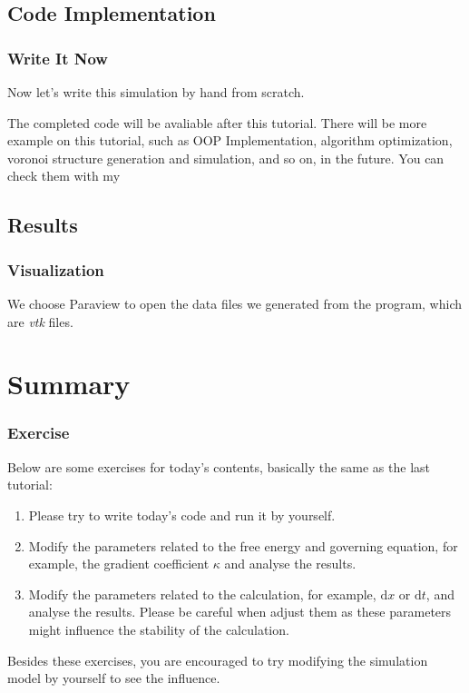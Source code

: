 \documentclass[compress,xcolor={dvipsnames}]{beamer}
\newcommand{\bhref}[2]{
    \href{#1}{\color{blue}{#2}}
}
\begin{document}
\subsection{Code Implementation}
\begin{frame}
    \frametitle{Write It Now}

    Now let's write this simulation by hand from scratch.

    The completed code will be avaliable after this tutorial. There will be more example on this tutorial, such as OOP Implementation, algorithm optimization, voronoi structure generation and simulation, and so on, in the future. You can check them with my \bhref{https://github.com/A-moment096/Phase-Field-Tutorial}{Github}

\end{frame}
\subsection{Results}
\begin{frame}
    \frametitle{Visualization}

    We choose Paraview to open the data files we generated from the program, which are \emph{vtk} files.

\end{frame}

\section{Summary}
\begin{frame}
    \frametitle{Exercise}

    Below are some exercises for today's contents, basically the same as the last tutorial:

    \begin{enumerate}
        \item Please try to write today's code and run it by yourself.
        \item Modify the parameters related to the free energy and governing equation, for example, the gradient coefficient \(\kappa\) and analyse the results.
        \item Modify the parameters related to the calculation, for example, \(\mathrm{d}x\) or \(\mathrm{d}t\), and analyse the results. Please be careful when adjust them as these parameters might influence the stability of the calculation.
    \end{enumerate}

    Besides these exercises, you are encouraged to try modifying the simulation model by yourself to see the influence.

\end{frame}
\end{document}

